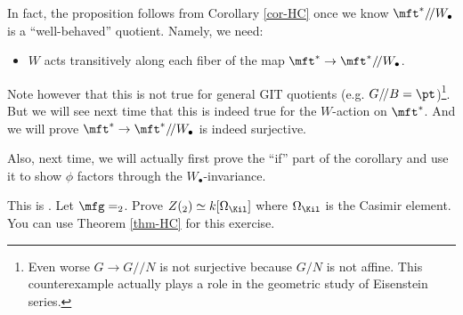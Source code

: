 \begin{rem}
	In fact, the proposition follows from Corollary \ref{cor-HC} once we know $\mft^*/\!/ W_\bullet$ is a ``well-behaved'' quotient. Namely, we need:
	\begin{itemize}
		\item $W$ acts transitively along each fiber of the map $\mft^* \to \mft^*/\!/ W_\bullet$.
	\end{itemize}
	Note however that this is not true for general GIT quotients (e.g. $G/\!/B = \pt$)\footnote{Even worse $G\to G/\!/N$ is not surjective because $G/N$ is not affine. This counterexample actually plays a role in the geometric study of Eisenstein series.}. But we will see next time that this is indeed true for the $W$-action on $\mft^*$. And we will prove $\mft^* \to \mft^*/\!/ W_\bullet$ is indeed surjective.

	Also, next time, we will actually first prove the ``if'' part of the corollary and use it to show $\phi$ factors through the $W_\bullet$-invariance.
\end{rem}


\begin{exe}
	This is . Let $\mfg=\sl_2$. Prove $Z(\sl_2)\simeq k[\Omega_\Kil]$ where $\Omega_\Kil$ is the Casimir element. You can use Theorem \ref{thm-HC} for this exercise.
\end{exe}



 


